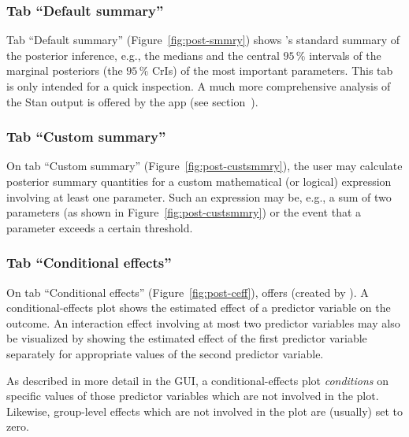 \subsubsection[Tab "Default summary"]{Tab ``Default summary''}
\label{tab-summary}

Tab ``Default summary'' (Figure~\ref{fig:post-smmry}) shows 's
standard  summary of the posterior inference, e.g., the medians and
the central $95\,\%$ intervals of the marginal posteriors (the $95\,\%$ CrIs) of
the most important parameters. This tab is only intended for a quick inspection.
A much more comprehensive analysis of the Stan output is offered by the
 app (see section~).

\subsubsection[Tab "Custom summary"]{Tab ``Custom summary''}
\label{tab-custsmmry}

On tab ``Custom summary'' (Figure~\ref{fig:post-custsmmry}), the user
may calculate posterior summary quantities for a custom mathematical (or
logical) expression involving at least one parameter. Such an expression may
be, e.g., a sum of two parameters (as shown in
Figure~\ref{fig:post-custsmmry}) or the event that a parameter exceeds a
certain threshold.

\subsubsection[Tab "Conditional effects"]{Tab ``Conditional effects''}
\label{tab-ceff}

On tab ``Conditional effects'' (Figure~\ref{fig:post-ceff}),
 offers  (created by
). A conditional-effects plot shows the
estimated effect of a predictor variable on the outcome. An interaction effect
involving at most two predictor variables may also be visualized by showing
the estimated effect of the first predictor variable separately for
appropriate values of the second predictor variable.

As described in more detail in the  GUI, a conditional-effects
plot \emph{conditions} on specific values of those predictor variables which
are not involved in the plot. Likewise, group-level effects which are not
involved in the plot are (usually) set to zero.

